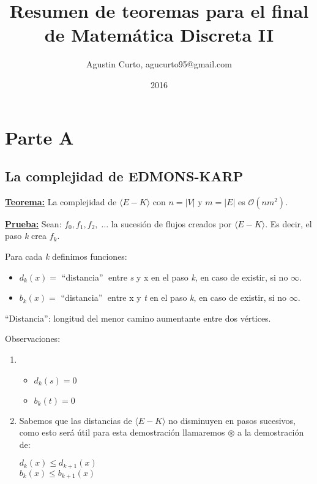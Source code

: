 \documentclass[12pt,a4paper]{report}
\author{Agustin Curto, agucurto95@gmail.com}
\title{Resumen de teoremas para el final \\ de Matemática Discreta  II}
\date{2016}
\providecommand{\abs}[1]{\lvert#1\rvert}
\begin{document}
\maketitle
\tableofcontents


\chapter{Parte A}

	\section{La complejidad de EDMONS-KARP}

		\textbf{\underline{Teorema:}} La complejidad de $\langle E-K \rangle$ con $n = \abs{V}$ y $m = \abs{E}$ es $\mathcal{O}(nm^{2})$.

		\textbf{\underline{Prueba:}} Sean: $f_{0}, f_{1}, f_{2}, \; \dotsc$ \;  la sucesión de flujos creados por $\langle E-K \rangle$. Es decir, el paso \textit{k} crea $f_{k}$.

		\vspace{5mm}
		Para cada \textit{k} definimos funciones:

		\begin{itemize}
			\item $d_{k}(x) =$ \textquotedblleft distancia\textquotedblright $\;$ entre \textit{s} y x en el paso \textit{k}, en caso de existir, si no $\infty$.
			\item $b_{k}(x) =$ \textquotedblleft distancia\textquotedblright $\;$ entre x y \textit{t} en el paso \textit{k}, en caso de existir, si no $\infty$.
		\end{itemize}

		\textquotedblleft Distancia\textquotedblright: longitud del menor camino aumentante entre dos vértices.

		\vspace{5mm}
		Observaciones:
			\begin{enumerate}
				\item
					\begin{itemize}
						\item $d_{k}(s) = 0$
						\item $b_{k}(t) = 0$
					\end{itemize}
				\item Sabemos que las distancias de $\langle E-K \rangle$ no disminuyen en pasos sucesivos, como esto será útil para esta demostración llamaremos $\circledast$ a la demostración de:
			\begin{center}
				$d_{k}(x) \leq d_{k+1}(x)$ \\
				$b_{k}(x) \leq b_{k+1}(x)$
			\end{center}
			\end{enumerate}
\end{document}
